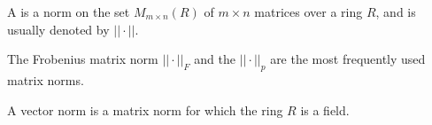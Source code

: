 \documentclass[12pt]{article}
\begin{document}
A  is a norm on the set
$M_{m\times n}(R)$ of $m\times n$ matrices over a ring $R$, and is 
usually denoted by $||\cdot||$.

The Frobenius matrix norm $||\cdot||_F$ and the  $||\cdot||_p$
are the most frequently used matrix norms.

A vector norm is a matrix norm for which the ring $R$ is a field.
\end{document}
